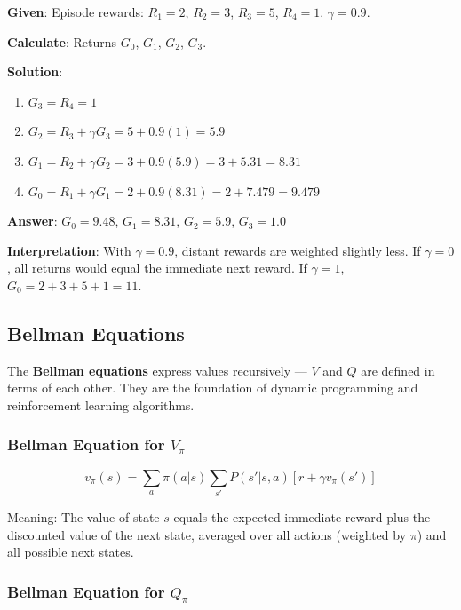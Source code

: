 \documentclass[11pt,a4paper]{article}
\begin{document}
\begin{tcolorbox}[colback=green!5!white,colframe=green!75!black,title=\textbf{Worked Example 21: Discounted Return Calculation}]
\textbf{Given}: Episode rewards: $R_1 = 2$, $R_2 = 3$, $R_3 = 5$, $R_4 = 1$. $\gamma = 0.9$.

\textbf{Calculate}: Returns $G_0$, $G_1$, $G_2$, $G_3$.

\textbf{Solution}:
\begin{enumerate}
    \item $G_3 = R_4 = 1$
    \item $G_2 = R_3 + \gamma G_3 = 5 + 0.9(1) = 5.9$
    \item $G_1 = R_2 + \gamma G_2 = 3 + 0.9(5.9) = 3 + 5.31 = 8.31$
    \item $G_0 = R_1 + \gamma G_1 = 2 + 0.9(8.31) = 2 + 7.479 = 9.479$
\end{enumerate}

\textbf{Answer}: $G_0 = 9.48$, $G_1 = 8.31$, $G_2 = 5.9$, $G_3 = 1.0$

\textbf{Interpretation}: With $\gamma = 0.9$, distant rewards are weighted slightly less. If $\gamma = 0$, all returns would equal the immediate next reward. If $\gamma = 1$, $G_0 = 2+3+5+1 = 11$.
\end{tcolorbox}

\subsection{Bellman Equations}

The \textbf{Bellman equations} express values recursively --- $V$ and $Q$ are defined in terms of each other. They are the foundation of dynamic programming and reinforcement learning algorithms.

\subsubsection{Bellman Equation for $V_\pi$}

\[
v_\pi(s) = \sum_a \pi(a|s) \sum_{s'} P(s'|s, a) [r + \gamma v_\pi(s')]
\]

Meaning: The value of state $s$ equals the expected immediate reward plus the discounted value of the next state, averaged over all actions (weighted by $\pi$) and all possible next states.

\subsubsection{Bellman Equation for $Q_\pi$}
\end{document}
